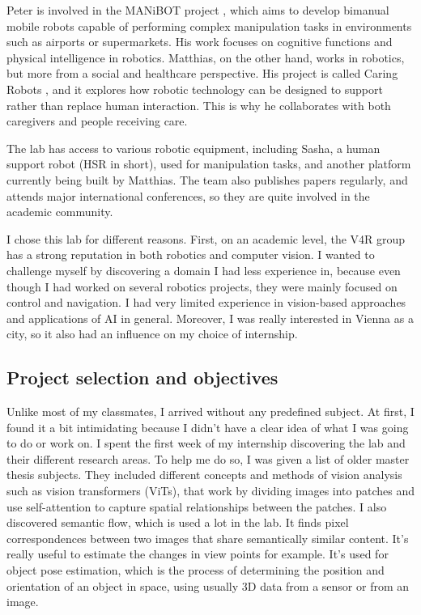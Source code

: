 Peter is involved in the MANiBOT project \cite{manibot}, which aims to develop bimanual mobile robots capable of performing complex manipulation tasks in environments such as airports or supermarkets. His work focuses on cognitive functions and physical intelligence in robotics. Matthias, on the other hand, works in robotics, but more from a social and healthcare perspective. His project is called Caring Robots \cite{caring}, and it explores how robotic technology can be designed to support rather than replace human interaction. This is why he collaborates with both caregivers and people receiving care.

The lab has access to various robotic equipment, including Sasha, a human support robot (HSR in short), used for manipulation tasks, and another platform currently being built by Matthias. The team also publishes papers regularly, and attends major international conferences, so they are quite involved in the academic community.

I chose this lab for different reasons. First, on an academic level, the V4R group has a strong reputation in both robotics and computer vision. I wanted to challenge myself by discovering a domain I had less experience in, because even though I had worked on several robotics projects, they were mainly focused on control and navigation. I had very limited experience in vision-based approaches and applications of AI in general. Moreover, I was really interested in Vienna as a city, so it also had an influence on my choice of internship.


\subsection{Project selection and objectives}

Unlike most of my classmates, I arrived without any predefined subject. At first, I found it a bit intimidating because I didn't have a clear idea of what I was going to do or work on. I spent the first week of my internship discovering the lab and their different research areas. To help me do so, I was given a list of older master thesis subjects. They included different concepts and methods of vision analysis such as vision transformers (ViTs), that work by dividing images into patches and use self-attention to capture spatial relationships between the patches. I also discovered semantic flow, which is used a lot in the lab. It finds pixel correspondences between two images that share semantically similar content. It's really useful to estimate the changes in view points for example. It's used for object pose estimation, which is the process of determining the position and orientation of an object in space, using usually 3D data from a sensor or from an image.

